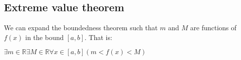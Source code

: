 
\subsection{Extreme value theorem}

We can expand the boundedness theorem such that \(m\) and \(M\) are functions of \(f(x)\) in the bound \([a,b]\). That is:

$\exists m \in \mathbb{R} \exists M\in \mathbb{R}\forall x\in [a,b](m<f(x)<M)$

